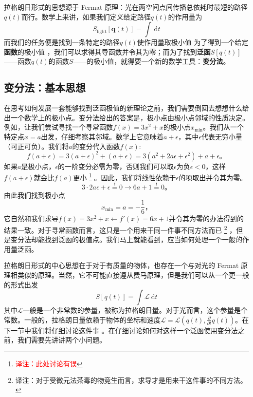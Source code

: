 拉格朗日形式的思想源于 Fermat 原理：光在两空间点间传播总依耗时最短的路径\(q(t)\)而行。数学上来讲，如果我们定义给定路径\(q(t)\)的作用量为
\begin{equation*}
S_{\text{light}}[{\mathbf q}(t)] = \int ~{\mathrm d}t
\end{equation*}
而我们的任务便是找到一条特定的路径\(q(t)\)使作用量取极小值%
%
为了得到一个给定{\bf 函数}的极小值%
%
，我们可以求得其导函数并令其为零；而为了找到{\bf 泛函}\(S[q(t)]\)——函数\(q(t)\)的函数\(S\)——的极小值，就得要一个新的数学工具：{\bf 变分法}。

\subsection{变分法：基本思想}\label{sec4.1.2}

在思考如何发展一套能够找到泛函极值的新理论之前，我们需要倒回去想想什么给出一个数学上的极小点。变分法给出的答案是，极小点由极小点邻域的性质决定。例如，让我们尝试寻找一个寻常函数\(f(x)=3x^2+x\)的极小点\(x_{\min}\)。我们从一个特定点\(x=a\)出发，仔细考察其邻域。数学上它意味着\(a + \epsilon\)，其中\(\epsilon\)代表无穷小量（可正可负）。我们将\(a\)的变分代入函数\(f(x)\):
\[
f(a+\epsilon) = 3(a+\epsilon)^2+(a+\epsilon) = 3(a^2+2a\epsilon+\epsilon^2)+a+\epsilon \text{。}
\]
如果\(a\)是极小点，\(\epsilon\)的一阶变分必需为零，否则我们可以取\(\epsilon\)为负\(\epsilon < 0\)，这样\(f(a+\epsilon)\)就会比\(f(a)\)更小%
\footnote{\textcolor{red}{译注：此处讨论有误}}%
。因此，我们将线性依赖于\(\epsilon\)的项取出并令其为零。
\[
3 \cdot 2a\epsilon + \epsilon \overset{\text{!}}{=} 0 \rightarrow 6a+1\overset{\text{!}}{=}0\text{。}
\]
由此我们找到极小点
\[
x_{\min} = a = -\frac{1}{6} \text{，}
\]
它自然和我们求导\(f(x)=3x^2+x\leftarrow f'(x)=6x+1\)并令其为零的办法得到的结果一致。对于寻常函数而言，这只是一个用来干同一件事不同方法而已%
\footnote{译注：对于受微元法茶毒的物竞生而言，求导才是用来干这件事的不同方法。}%
，但是变分法却能找到泛函的极值点。我们马上就能看到，应当如何处理一个一般的作用量泛函。

拉格朗日形式的中心思想在于对于有质量的物体，也存在一个与对光的 Fermat 原理相类似的原理。当然，它不可能直接遵从费马原理，但是我们可以从一个更一般的形式出发
\[
S[q(t)]=\int {\mathcal L}~{\mathrm d}t
\]
其中\(\mathcal L\)一般是一个非常数的参量，被称为拉格朗日量。对于光而言，这个参量是个常数。一般的，拉格朗日量依赖于物体的坐标和速度\({\mathcal L}={\mathcal L}(q(t),\frac{\partial}{\partial t} q(t))\)。在下一节中我们将仔细讨论这件事%
%
。在仔细讨论如何对这样一个泛函使用变分法之前，我们需要先讲讲两个小问题。

